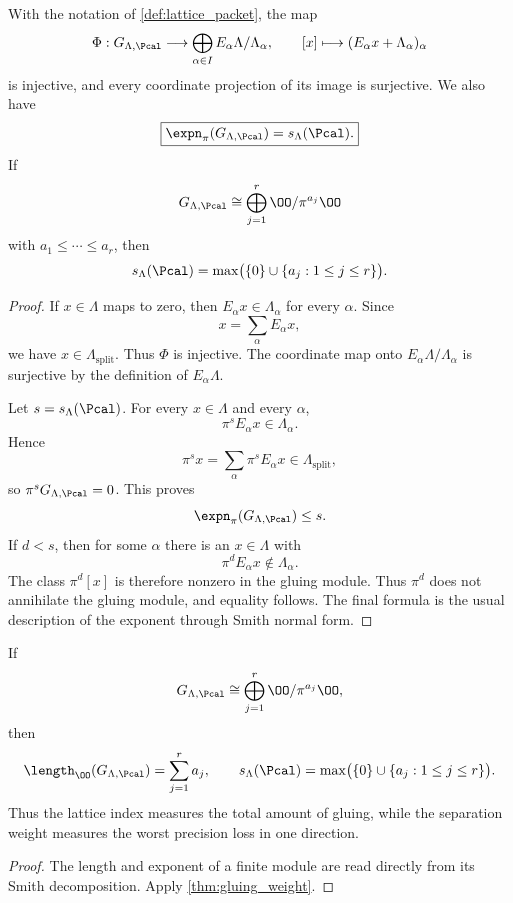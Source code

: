 \begin{theorem}\label{thm:gluing_weight}
With the notation of \cref{def:lattice_packet}, the map
\[
\Phi:G_{\Lambda,\Pcal}
\longrightarrow
\bigoplus_{\alpha\in I}E_\alpha\Lambda/\Lambda_\alpha,
\qquad
[x]\longmapsto(E_\alpha x+\Lambda_\alpha)_\alpha
\]
is injective, and every coordinate projection of its image is surjective.  We also have
\[
\boxed{
\expn_\pi(G_{\Lambda,\Pcal})
=
s_\Lambda(\Pcal).
}
\]
If
\[
G_{\Lambda,\Pcal}
\cong
\bigoplus_{j=1}^r\OO/\pi^{a_j}\OO
\]
with $a_1\leq\cdots\leq a_r$, then
\[
s_\Lambda(\Pcal)=\max\bigl(\{0\}\cup\{a_j:1\leq j\leq r\}\bigr).
\]
\end{theorem}

\begin{proof}
If $x\in\Lambda$ maps to zero, then $E_\alpha x\in\Lambda_\alpha$ for every $\alpha$.  Since
\[
x=\sum_\alpha E_\alpha x,
\]
we have $x\in\Lambda_{\mathrm{split}}$.  Thus $\Phi$ is injective.  The coordinate map onto $E_\alpha\Lambda/\Lambda_\alpha$ is surjective by the definition of $E_\alpha\Lambda$.

Let $s=s_\Lambda(\Pcal)$.  For every $x\in\Lambda$ and every $\alpha$,
\[
\pi^sE_\alpha x\in\Lambda_\alpha.
\]
Hence
\[
\pi^sx=\sum_\alpha\pi^sE_\alpha x\in\Lambda_{\mathrm{split}},
\]
so $\pi^sG_{\Lambda,\Pcal}=0$.  This proves
\[
\expn_\pi(G_{\Lambda,\Pcal})\leq s.
\]
If $d<s$, then for some $\alpha$ there is an $x\in\Lambda$ with
\[
\pi^dE_\alpha x\notin\Lambda_\alpha.
\]
The class $\pi^d[x]$ is therefore nonzero in the gluing module.  Thus $\pi^d$ does not annihilate the gluing module, and equality follows.  The final formula is the usual description of the exponent through Smith normal form.
\end{proof}

\begin{corollary}\label{cor:length_and_weight}
If
\[
G_{\Lambda,\Pcal}
\cong
\bigoplus_{j=1}^r\OO/\pi^{a_j}\OO,
\]
then
\[
\length_{\OO}(G_{\Lambda,\Pcal})
=
\sum_{j=1}^ra_j,
\qquad
s_\Lambda(\Pcal)=\max\bigl(\{0\}\cup\{a_j:1\leq j\leq r\}\bigr).
\]
Thus the lattice index measures the total amount of gluing, while the separation weight measures the worst precision loss in one direction.
\end{corollary}

\begin{proof}
The length and exponent of a finite module are read directly from its Smith decomposition.  Apply \cref{thm:gluing_weight}.
\end{proof}

